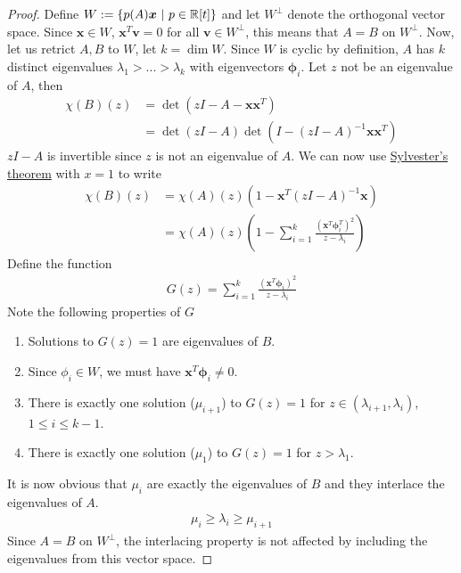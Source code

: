 \documentclass{math}
\renewcommand{\vec}[1]{\boldsymbol{#1}}
\begin{document}
\begin{proof}
    Define $W := \setc{p(A)\vec{x}}{p \in \mathbb{R}[t]}$ and let $W^\perp$ denote the orthogonal vector space.
    Since $\vec{x} \in W$, $\vec{x}^T \vec{v} = 0$ for all $\vec{v} \in W^\perp$, this means that $A = B$ on $W^\perp$.
    Now, let us retrict $A, B$ to $W$, let $k = \dim W$.
    Since $W$ is cyclic by definition, $A$ has $k$ distinct eigenvalues $\lambda_1 > ... > \lambda_k$ with eigenvectors $\vec{\phi}_i$.
    Let $z$ not be an eigenvalue of $A$, then
    \begin{align*}
        \chi(B)(z) & = \det(zI - A - \vec{x}\vec{x}^T)                      \\
                   & = \det(zI - A) \det(I - (zI - A)^{-1}\vec{x}\vec{x}^T)
    \end{align*}
    $zI-A$ is invertible since $z$ is not an eigenvalue of $A$. We can now use \hyperref[lemma:sylvester]{Sylvester's theorem} with $x = 1$ to write
    \begin{align*}
        \chi(B)(z) & = \chi(A)(z)(1 - \vec{x}^T (zI - A)^{-1} \vec{x})                                              \\
                   & = \chi(A)(z)\left(1 - \sum_{i = 1}^k \frac{(\vec{x}^T \vec{\phi}_i^T)^2}{z - \lambda_i}\right)
    \end{align*}
    Define the function
    \begin{align*}
        G(z) = \sum_{i=1}^k \frac{(\vec{x}^T \vec{\phi}_i)^2}{z - \lambda_i}
    \end{align*}
    Note the following properties of $G$
    \begin{enumerate}
        \item Solutions to $G(z) = 1$ are eigenvalues of $B$.
        \item Since $\phi_i \in W$, we must have $\vec{x}^T \vec{\phi}_i \neq 0$.
        \item There is exactly one solution ($\mu_{i + 1}$) to $G(z) = 1$ for $z \in (\lambda_{i + 1}, \lambda_{i})$, $1 \leq i \leq k - 1$.
        \item There is exactly one solution ($\mu_1$) to $G(z) = 1$ for $z > \lambda_1$.
    \end{enumerate}
    It is now obvious that $\mu_i$ are exactly the eigenvalues of $B$ and they interlace the eigenvalues of $A$.
    \begin{align*}
        \mu_i \geq \lambda_i \geq \mu_{i + 1}
    \end{align*}
    Since $A=B$ on $W^\perp$, the interlacing property is not affected by including the eigenvalues from this vector space.
\end{proof}
\end{document}
